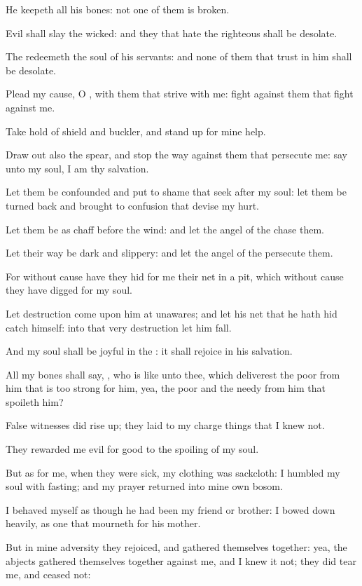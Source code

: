\Verse He keepeth all his bones: not one of them is broken.

\Verse Evil shall slay the wicked: and they that hate the righteous shall be desolate.

\Verse The \LORD redeemeth the soul of his servants: and none of them that trust in him shall be desolate.




\Chapter
\Verse Plead my cause, O \LORD, with them that strive with me: fight against them that fight against me.

\Verse Take hold of shield and buckler, and stand up for mine help.

\Verse Draw out also the spear, and stop the way against them that persecute me: say unto my soul, I am thy salvation.

\Verse Let them be confounded and put to shame that seek after my soul: let them be turned back and brought to confusion that devise my hurt.

\Verse Let them be as chaff before the wind: and let the angel of the \LORD chase them.

\Verse Let their way be dark and slippery: and let the angel of the \LORD persecute them.

\Verse For without cause have they hid for me their net in a pit, which without cause they have digged for my soul.

\Verse Let destruction come upon him at unawares; and let his net that he hath hid catch himself: into that very destruction let him fall.

\Verse And my soul shall be joyful in the \LORD: it shall rejoice in his salvation.

\Verse All my bones shall say, \LORD, who is like unto thee, which deliverest the poor from him that is too strong for him, yea, the poor and the needy from him that spoileth him?

\Verse False witnesses did rise up; they laid to my charge things that I knew not.

\Verse They rewarded me evil for good to the spoiling of my soul.

\Verse But as for me, when they were sick, my clothing was sackcloth: I humbled my soul with fasting; and my prayer returned into mine own bosom.

\Verse I behaved myself as though he had been my friend or brother: I bowed down heavily, as one that mourneth for his mother.

\Verse But in mine adversity they rejoiced, and gathered themselves together: yea, the abjects gathered themselves together against me, and I knew it not; they did tear me, and ceased not:

